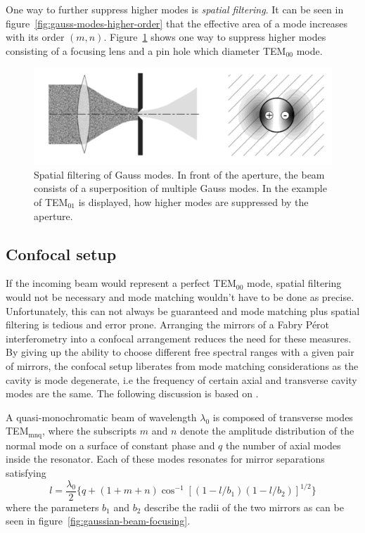 One way to further suppress higher modes is \textit{spatial filtering}. It can be seen in figure~\ref{fig:gauss-modes-higher-order} that the effective area of a mode increases with its order $(m, n)$. Figure~\ref{fig:spatial-filtering-of-gauss-modes} shows one way to suppress higher modes consisting of a focusing lens and a pin hole which diameter TEM$_{00}$ mode.

\begin{figure}[H]
	\centering
	\includegraphics[width=0.8\linewidth]{figures/fabry-perot/spatial-filtering-of-gauss-modes}
	\caption[Spatial filtering of Gauss modes.]{Spatial filtering of Gauss modes.
		In front of the aperture, the beam consists of a superposition of multiple Gauss modes.
		In the example of TEM$_{01}$ is displayed, how higher modes are suppressed by the aperture.~\cite{meschede_optik_2008}}
		\label{fig:spatial-filtering-of-gauss-modes}
	\end{figure}



\subsection{Confocal setup}
\label{subsec:confocal-setup}

If the incoming beam would represent a perfect TEM$_{00}$ mode, spatial filtering would not be necessary and mode matching wouldn't have to be done as precise. Unfortunately, this can not always be guaranteed and mode matching plus spatial filtering is tedious and error prone. Arranging the mirrors of a Fabry Pérot interferometry into a confocal arrangement reduces the need for these measures.
By giving up the ability to choose different free spectral ranges with a given pair of mirrors, the confocal setup liberates from mode matching considerations as the cavity is mode degenerate, i.e the frequency of certain axial and transverse cavity modes are the same.
The following discussion is based on \textcite{hercher_spherical_1968}.

A quasi-monochromatic beam of wavelength $\lambda_0$ is composed of transverse modes TEM$_{\textrm{mnq}}$, where the subscripts $m$ and $n$ denote the amplitude distribution of the normal mode on a surface of constant phase and $q$ the number of axial modes inside the resonator.
Each of these modes resonates for mirror separations satisfying
\begin{equation}
l = \frac{\lambda_0}{2}\{q + \left(1 + m + n\right) \cos^{-1}\left[(1-l/b_1)(1-l/b_2)\right]^{1/2}\}
\end{equation}
where the parameters $b_1$ and $b_2$ describe the radii of the two mirrors as can be seen in figure~\ref{fig:gaussian-beam-focusing}.

